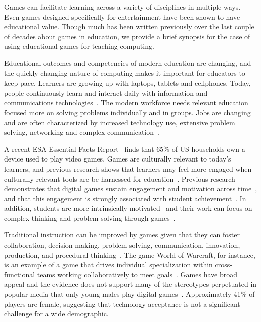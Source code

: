 \documentclass{sig-alternate-05-2015}
\begin{document}
Games can facilitate learning across a variety of disciplines in multiple ways. Even games designed specifically for entertainment have been shown to have educational value. Though much has been written previously over the last couple of decades about games in education, we provide a brief synopsis for the case of using educational games for teaching computing. 



Educational outcomes and competencies of modern education are changing, and the quickly changing nature of computing makes it important for educators to keep pace. Learners are growing up with laptops, tablets and cellphones. Today, people continuously learn and interact daily with information and communications technologies~\cite{burkhardt2003engauge}. The modern workforce needs relevant education focused more on solving problems individually and in groups. Jobs are changing and are often characterized by increased technology use, extensive problem solving, networking and complex communication~\cite{levy2004education}. 



A recent ESA Essential Facts Report~\cite{esa2016facts} finds that 65\% of US households own a device used to play video games. Games are culturally relevant to today's learners, and previous research shows that learners may feel more engaged when culturally relevant tools are be harnessed for education~\cite{ladson1995toward}. Previous research demonstrates that digital games sustain engagement and motivation across time~\cite{gee2003video,rupp2010evidence}, and that this engagement is strongly associated with student achievement~\cite{shute2009melding}. In addition, students are more intrinsically motivated~\cite{gee2005good} and their work can focus on complex thinking and problem solving through games~\cite{barab2007games}. 



Traditional instruction can be improved by games given that they can foster collaboration, decision-making, problem-solving, communication, innovation, production, and procedural thinking~\cite{johnson11horizon, shaffer2012online}. The game World of Warcraft, for instance, is an example of a game that drives individual specialization within cross-functional teams working collaboratively to meet goals~\cite{gee2005good}. Games have broad appeal and the evidence does not support many of the stereotypes perpetuated in popular media that only young males play digital games~\cite{williams2008plays}. Approximately 41\% of players are female, suggesting that technology acceptance is not a significant challenge for a wide demographic.
\end{document}
